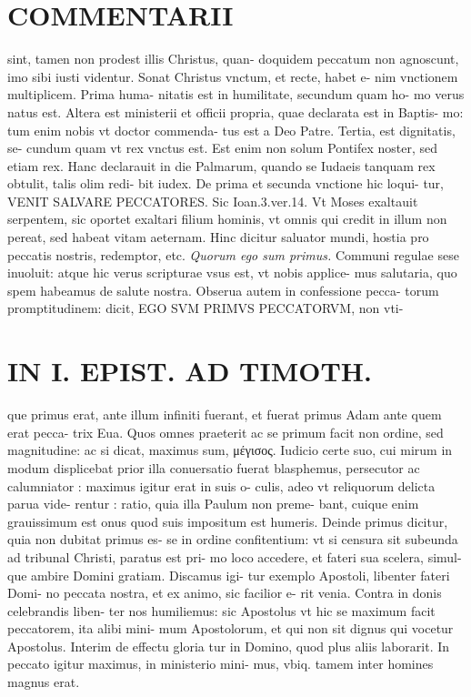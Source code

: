 \documentclass{article}
\begin{document}
\begin{pages}
\section*{COMMENTARII }
\marginpar{[ p.34 ]}\pstart sint, tamen non prodest illis Christus, quan- doquidem peccatum non agnoscunt, imo sibi iusti videntur.  \pend\pstart Sonat Christus vnctum, et recte, habet e- nim vnctionem multiplicem. Prima huma- nitatis est in humilitate, secundum quam ho- mo verus natus est. Altera est ministerii et officii propria, quae declarata est in Baptis- mo: tum enim nobis vt doctor commenda- tus est a Deo Patre. Tertia, est dignitatis, se- cundum quam vt rex vnctus est. Est enim non solum Pontifex noster, sed etiam rex. Hanc declarauit in die Palmarum, quando se Iudaeis tanquam rex obtulit, talis olim redi- bit iudex.  \pend\pstart De prima et secunda vnctione hic loqui- tur, VENIT SALVARE PECCATORES. Sic Ioan.3.ver.14. Vt Moses exaltauit serpentem, sic oportet exaltari filium hominis, vt omnis qui credit in illum non pereat, sed habeat vitam aeternam. Hinc dicitur saluator mundi, hostia pro peccatis nostris, redemptor, etc.  \pend
\textit{Quorum ego sum primus. }\pstart Communi regulae sese inuoluit: atque hic verus scripturae vsus est, vt nobis applice- mus salutaria, quo spem habeamus de salute nostra. Obserua autem in confessione pecca- torum promptitudinem: dicit, EGO SVM PRIMVS PECCATORVM, non vti-  \pend
\section*{IN I. EPIST. AD TIMOTH. }
\marginpar{[ p.35 ]}\pstart que primus erat, ante illum infiniti fuerant, et fuerat primus Adam ante quem erat pecca- trix Eua. Quos omnes praeterit ac se primum facit non ordine, sed magnitudine: ac si dicat, maximus sum, μέγισος. Iudicio certe suo, cui mirum in modum displicebat prior illa conuersatio fuerat blasphemus, persecutor ac calumniator : maximus igitur erat in suis o- culis, adeo vt reliquorum delicta parua vide- rentur : ratio, quia illa Paulum non preme- bant, cuique enim grauissimum est onus quod suis impositum est humeris. Deinde primus dicitur, quia non dubitat primus es- se in ordine confitentium: vt si censura sit subeunda ad tribunal Christi, paratus est pri- mo loco accedere, et fateri sua scelera, simul- que ambire Domini gratiam. Discamus igi- tur exemplo Apostoli, libenter fateri Domi- no peccata nostra, et ex animo, sic facilior e- rit venia. Contra in donis celebrandis liben- ter nos humiliemus: sic Apostolus vt hic se maximum facit peccatorem, ita alibi mini- mum Apostolorum, et qui non sit dignus qui vocetur Apostolus. Interim de effectu gloria tur in Domino, quod plus aliis laborarit. In peccato igitur maximus, in ministerio mini- mus, vbiq. tamem inter homines magnus erat.  \pend

\end{pages}
\end{document}
